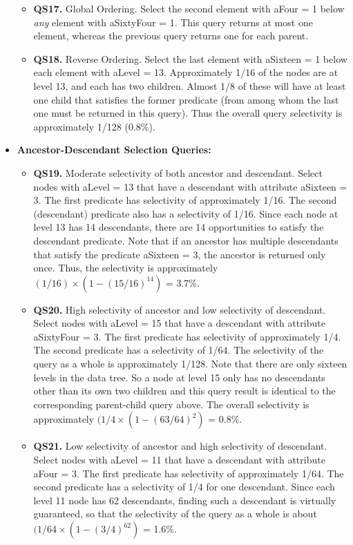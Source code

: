 \begin{itemize}
\begin{itemize}
\item {\bf QS17.} Global Ordering.  Select the second element with {\sf aFour = 1}
below
{\em any} element with {\sf aSixtyFour = 1}.  This query returns at most one
element, whereas the previous query returns one for each parent.

\item {\bf QS18.} Reverse Ordering.  Select the last element with {\sf aSixteen = 1} below
each element with {\sf aLevel = 13}.  Approximately 1/16 of the nodes are at
level 13, and each has two children.  Almost 1/8 of these will have at least
one child that satisfies the former predicate (from among whom the last one
must be returned in this query).  Thus the overall query selectivity is
approximately 1/128 (0.8\%).

\end{itemize}
\item
{\bf Ancestor-Descendant Selection Queries:}
\begin{itemize}
\item {\bf QS19.} Moderate selectivity of both ancestor and descendant.
Select nodes with {\sf aLevel = 13} that have a descendant with
attribute {\sf aSixteen = 3}.  The first predicate has selectivity
of approximately 1/16. The second (descendant) predicate also has
a selectivity of 1/16.  Since each node at level 13 has 14
descendants, there are 14 opportunities to satisfy the descendant
predicate.
Note that if an ancestor has multiple descendants that satisfy the predicate {\sf aSixteen = 3}, the ancestor is returned only once. Thus, the selectivity is approximately $(1/16) \times (1 - (15/16)^{14})$ = 3.7\%.

\item {\bf QS20.} High selectivity of ancestor and low selectivity of descendant.
Select nodes with {\sf aLevel = 15} that have a descendant with attribute {\sf
aSixtyFour = 3}.  The first predicate has selectivity of approximately 1/4.
The second predicate has a selectivity of 1/64.  The selectivity of the query
as a whole is approximately 1/128.  Note that there are only sixteen levels
in the data tree.  So a node at level 15 only has no descendants other than
its own two children and this query result is identical to the corresponding
parent-child query above.  The overall selectivity is approximately $(1/4 \times (1 - (63/64)^2)$ = 0.8\%.

\item {\bf QS21.} Low selectivity of ancestor and high selectivity of descendant.
Select nodes with {\sf aLevel = 11} that have a descendant with attribute {\sf
aFour = 3}.  The first predicate has selectivity of approximately 1/64.
The second predicate has a selectivity of 1/4 for one descendant.  Since each
level 11 node has 62 descendants, finding such a descendant is virtually
guaranteed, so that the selectivity of the query as a whole is about $(1/64 \times (1 - (3/4)^{62})$ = 1.6\%. 
\end{itemize}


\end{itemize}
